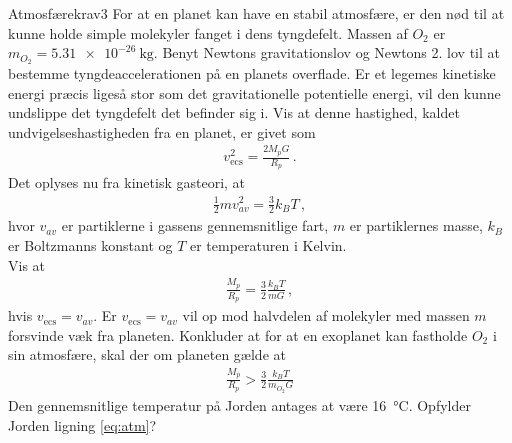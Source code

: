 \begin{opgave}{Atmosfærekrav}{3}
For at en planet kan have en stabil atmosfære, er den nød til at kunne holde simple molekyler fanget i dens tyngdefelt. Massen af $O_2$ er $m_{O_2} = \SI{5,31e-26}{\kilo\gram}$.
\opg Benyt Newtons gravitationslov og Newtons 2. lov til at bestemme tyngdeaccelerationen på en planets overflade.
\opg Er et legemes kinetiske energi præcis ligeså stor som det gravitationelle potentielle energi, vil den kunne undslippe det tyngdefelt det befinder sig i. Vis at denne hastighed, kaldet undvigelseshastigheden fra en planet, er givet som
\begin{align*}
	v_\mathrm{ecs}^2 = \frac{2M_pG}{R_p} \, .
\end{align*}
\opg Det oplyses nu fra kinetisk gasteori, at
\begin{align*}
	\frac{1}{2}mv_{av}^2 = \frac{3}{2}k_BT \, ,
\end{align*}
hvor $v_{av}$ er partiklerne i gassens gennemsnitlige fart, $m$ er partiklernes masse, $k_B$ er Boltzmanns konstant og $T$ er temperaturen i Kelvin. \\
Vis at
\begin{align*}
	\frac{M_p}{R_p} = \frac{3}{2}\frac{k_BT}{mG} \, ,
\end{align*}
hvis $v_\mathrm{ecs} = v_{av}$.
\opg Er $v_\mathrm{ecs} = v_{av}$ vil op mod halvdelen af molekyler med massen $m$ forsvinde væk fra planeten. Konkluder at for at en exoplanet kan fastholde $O_2$ i sin atmosfære, skal der om planeten gælde at
\begin{align} \label{eq:atm}
	\frac{M_p}{R_p} > \frac{3}{2}\frac{k_BT}{m_{O_2}G}
\end{align}
\opg Den gennemsnitlige temperatur på Jorden antages at være \SI{16}{\celsius}. Opfylder Jorden ligning \eqref{eq:atm}? \\
\end{opgave}
%
%
